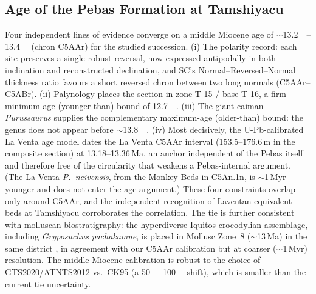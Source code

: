 \documentclass[11pt]{article}
\begin{document}
\subsection{Age of the Pebas Formation at Tamshiyacu}
Four independent lines of evidence converge on a middle Miocene age of
$\sim$\SIrange{13.2}{13.4}{\mega\annum} (chron C5AAr) for the studied
succession. (i) The polarity record: each site preserves a single robust
reversal, now expressed antipodally in both inclination and reconstructed
declination, and SC's Normal--Reversed--Normal thickness ratio favours a short
reversed chron between two long normals (C5AAr--C5ABr). (ii) Palynology places
the section in zone T-15 / base T-16, a firm minimum-age (younger-than) bound of
\SI{12.7}{\mega\annum}. (iii) The giant caiman \textit{Purussaurus} supplies the
complementary maximum-age (older-than) bound: the genus does not appear before
$\sim$\SI{13.8}{\mega\annum}. (iv) Most decisively, the U-Pb-calibrated La Venta age model \citep{MoraRojas2023}
dates the La Venta C5AAr interval (153.5--176.6\,m in the composite section) at
13.18--13.36\,Ma, an anchor independent of the Pebas itself and therefore free of the
circularity that weakens a Pebas-internal argument. (The La Venta \textit{P.\
neivensis}, from the Monkey Beds in C5An.1n, is $\sim$1\,Myr younger and does not enter
the age argument.) These four constraints overlap only around C5AAr, and the independent
recognition of Laventan-equivalent beds at Tamshiyacu \citep{Carrillo2023}
corroborates the correlation. The tie is further consistent with molluscan
biostratigraphy: the hyperdiverse Iquitos crocodylian assemblage, including
\textit{Gryposuchus pachakamue}, is placed in Mollusc Zone~8 ($\sim$13\,Ma) in the
same district \citep{SalasGismondi2016}, in agreement with our C5AAr calibration
but at coarser ($\sim$1\,Myr) resolution. The middle-Miocene calibration is robust to the
choice of GTS2020/ATNTS2012 vs.\ CK95 (a \SIrange{50}{100}{\kilo\annum} shift),
which is smaller than the current tie uncertainty.
\end{document}
